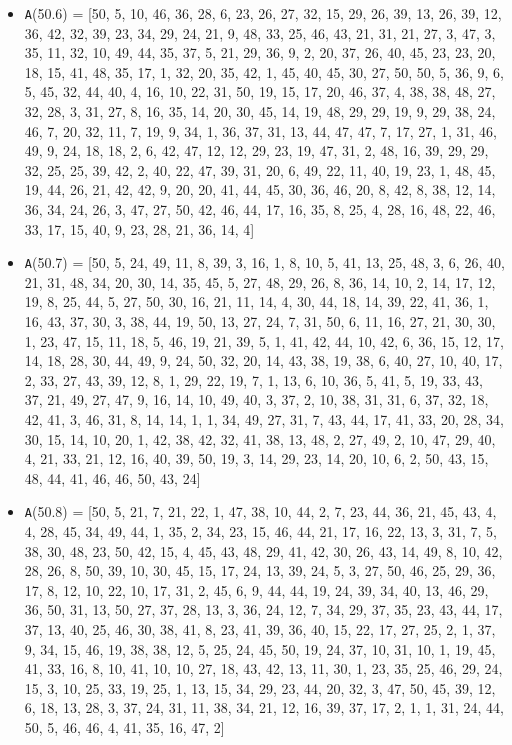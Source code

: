 \documentclass[runningheads, a4paper]{llncs}
\begin{document}
\begin{itemize}
	\item {\texttt A(50.6) = } [50, 5, 10, 46, 36, 28, 6, 23, 26, 27, 32, 15, 29, 26, 39, 13, 26, 39, 12, 36, 42, 32, 39, 23, 34, 29, 24, 21, 9, 48, 33, 25, 46, 43, 21, 31, 21, 27, 3, 47, 3, 35, 11, 32, 10, 49, 44, 35, 37, 5, 21, 29, 36, 9, 2, 20, 37, 26, 40, 45, 23, 23, 20, 18, 15, 41, 48, 35, 17, 1, 32, 20, 35, 42, 1, 45, 40, 45, 30, 27, 50, 50, 5, 36, 9, 6, 5, 45, 32, 44, 40, 4, 16, 10, 22, 31, 50, 19, 15, 17, 20, 46, 37, 4, 38, 38, 48, 27, 32, 28, 3, 31, 27, 8, 16, 35, 14, 20, 30, 45, 14, 19, 48, 29, 29, 19, 9, 29, 38, 24, 46, 7, 20, 32, 11, 7, 19, 9, 34, 1, 36, 37, 31, 13, 44, 47, 47, 7, 17, 27, 1, 31, 46, 49, 9, 24, 18, 18, 2, 6, 42, 47, 12, 12, 29, 23, 19, 47, 31, 2, 48, 16, 39, 29, 29, 32, 25, 25, 39, 42, 2, 40, 22, 47, 39, 31, 20, 6, 49, 22, 11, 40, 19, 23, 1, 48, 45, 19, 44, 26, 21, 42, 42, 9, 20, 20, 41, 44, 45, 30, 36, 46, 20, 8, 42, 8, 38, 12, 14, 36, 34, 24, 26, 3, 47, 27, 50, 42, 46, 44, 17, 16, 35, 8, 25, 4, 28, 16, 48, 22, 46, 33, 17, 15, 40, 9, 23, 28, 21, 36, 14, 4]
	\item {\texttt A(50.7) = } [50, 5, 24, 49, 11, 8, 39, 3, 16, 1, 8, 10, 5, 41, 13, 25, 48, 3, 6, 26, 40, 21, 31, 48, 34, 20, 30, 14, 35, 45, 5, 27, 48, 29, 26, 8, 36, 14, 10, 2, 14, 17, 12, 19, 8, 25, 44, 5, 27, 50, 30, 16, 21, 11, 14, 4, 30, 44, 18, 14, 39, 22, 41, 36, 1, 16, 43, 37, 30, 3, 38, 44, 19, 50, 13, 27, 24, 7, 31, 50, 6, 11, 16, 27, 21, 30, 30, 1, 23, 47, 15, 11, 18, 5, 46, 19, 21, 39, 5, 1, 41, 42, 44, 10, 42, 6, 36, 15, 12, 17, 14, 18, 28, 30, 44, 49, 9, 24, 50, 32, 20, 14, 43, 38, 19, 38, 6, 40, 27, 10, 40, 17, 2, 33, 27, 43, 39, 12, 8, 1, 29, 22, 19, 7, 1, 13, 6, 10, 36, 5, 41, 5, 19, 33, 43, 37, 21, 49, 27, 47, 9, 16, 14, 10, 49, 40, 3, 37, 2, 10, 38, 31, 31, 6, 37, 32, 18, 42, 41, 3, 46, 31, 8, 14, 14, 1, 1, 34, 49, 27, 31, 7, 43, 44, 17, 41, 33, 20, 28, 34, 30, 15, 14, 10, 20, 1, 42, 38, 42, 32, 41, 38, 13, 48, 2, 27, 49, 2, 10, 47, 29, 40, 4, 21, 33, 21, 12, 16, 40, 39, 50, 19, 3, 14, 29, 23, 14, 20, 10, 6, 2, 50, 43, 15, 48, 44, 41, 46, 46, 50, 43, 24]
	\item {\texttt A(50.8) = } [50, 5, 21, 7, 21, 22, 1, 47, 38, 10, 44, 2, 7, 23, 44, 36, 21, 45, 43, 4, 4, 28, 45, 34, 49, 44, 1, 35, 2, 34, 23, 15, 46, 44, 21, 17, 16, 22, 13, 3, 31, 7, 5, 38, 30, 48, 23, 50, 42, 15, 4, 45, 43, 48, 29, 41, 42, 30, 26, 43, 14, 49, 8, 10, 42, 28, 26, 8, 50, 39, 10, 30, 45, 15, 17, 24, 13, 39, 24, 5, 3, 27, 50, 46, 25, 29, 36, 17, 8, 12, 10, 22, 10, 17, 31, 2, 45, 6, 9, 44, 44, 19, 24, 39, 34, 40, 13, 46, 29, 36, 50, 31, 13, 50, 27, 37, 28, 13, 3, 36, 24, 12, 7, 34, 29, 37, 35, 23, 43, 44, 17, 37, 13, 40, 25, 46, 30, 38, 41, 8, 23, 41, 39, 36, 40, 15, 22, 17, 27, 25, 2, 1, 37, 9, 34, 15, 46, 19, 38, 38, 12, 5, 25, 24, 45, 50, 19, 24, 37, 10, 31, 10, 1, 19, 45, 41, 33, 16, 8, 10, 41, 10, 10, 27, 18, 43, 42, 13, 11, 30, 1, 23, 35, 25, 46, 29, 24, 15, 3, 10, 25, 33, 19, 25, 1, 13, 15, 34, 29, 23, 44, 20, 32, 3, 47, 50, 45, 39, 12, 6, 18, 13, 28, 3, 37, 24, 31, 11, 38, 34, 21, 12, 16, 39, 37, 17, 2, 1, 1, 31, 24, 44, 50, 5, 46, 46, 4, 41, 35, 16, 47, 2]

\end{itemize}
\end{document}
